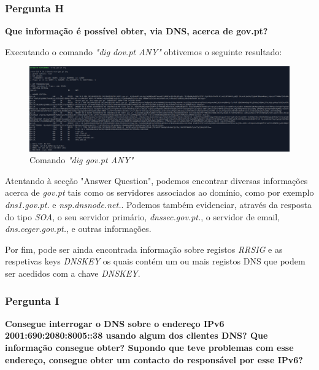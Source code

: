 \documentclass[11pt]{article}
\begin{document}
\subsubsection{Pergunta H}

\textbf{Que informação é possível obter, via DNS, acerca de gov.pt?}

\par Executando o comando \textit{"dig dov.pt ANY"} obtivemos o seguinte resultado:

\begin{figure}[!htb]
    \centering
    \includegraphics[width=\textwidth]{images/Parte1/p1_h.PNG}
    \caption{Comando \textit{"dig gov.pt ANY"}}
    \label{fig:diggov}
\end{figure}

\par Atentando à secção "Answer Question", podemos encontrar diversas informações acerca de \textit{gov.pt} tais como os servidores associados ao domínio, como por exemplo \textit{dns1.gov.pt.} e \textit{nsp.dnsnode.net.}. Podemos também evidenciar, através da resposta do tipo \textit{SOA}, o seu servidor primário, \textit{dnssec.gov.pt.}, o servidor de email, \textit{dns.ceger.gov.pt.}, e outras informações.

\par Por fim, pode ser ainda encontrada informação sobre registos \textit{RRSIG} e as respetivas keys \textit{DNSKEY} os quais contém um ou mais registos DNS que podem ser acedidos com a chave \textit{DNSKEY}.

\subsubsection{Pergunta I}

\textbf{Consegue interrogar o DNS sobre o endereço IPv6 2001:690:2080:8005::38 usando algum dos clientes DNS? Que informação consegue obter? Supondo que teve problemas com esse endereço, consegue obter um contacto do responsável por esse IPv6?}
\end{document}
